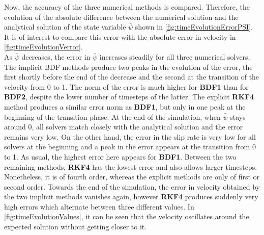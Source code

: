 Now, the accuracy of the three numerical methods is compared. Therefore, the evolution of the absolute difference between the numerical solution and the analytical solution of the state variable $\bar{\psi}$ shown in \autoref{fig:timeEvolutionErrorPSI}. It is of interest to compare this error with the absolute error in velocity in \autoref{fig:timeEvolutionVerror}. \\ 
As $\bar{\psi}$ decreases, the error in $\bar{\psi}$ increases steadily for all three numerical solvers. The implicit BDF methods produce two peaks in the evolution of the error, the first shortly before the end of the decrease and the second at the transition of the velocity from 0 to 1. The norm of the error is much higher for \textbf{BDF1} than for \textbf{BDF2}, despite the lower number of timesteps of the latter. The explicit \textbf{RKF4} method produces a similar error norm as \textbf{BDF1}, but only in one peak at the beginning of the transition phase. At the end of the simulation, when $\bar{\psi}$ stays around 0, all solvers match closely with the analytical solution and the error remains very low. On the other hand, the error in the slip rate is very low for all solvers at the beginning and a peak in the error appears at the transition from 0 to 1. As usual, the highest error here appears for \textbf{BDF1}. Between the two remaining methods, \textbf{RKF4} has the lowest error and also allows larger timesteps. Nonetheless, it is of fourth order, whereas the explicit methods are only of first or second order. Towards the end of the simulation, the error in velocity obtained by the two implicit methods vanishes again, however \textbf{RKF4} produces suddenly very high errors which alternate between three different values. In \autoref{fig:timeEvolutionValues}, it can be seen that the velocity oscillates around the expected solution without getting closer to it. \\
